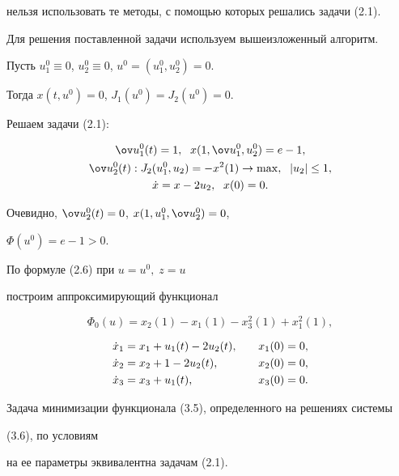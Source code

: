 \begin{exam}
нельзя использовать те методы, с помощью которых решались задачи (2.1).





Для решения поставленной задачи используем вышеизложенный алгоритм.


Пусть $u_1^0\equiv 0$, $u_2^0\equiv 0$, $u^0=(u_1^0,u_2^0)=0$.


Тогда $x(t,u^0)=0$, $J_1(u^0)=J_2(u^0)=0$.


Решаем задачи (2.1):


\begin{gather*}


\ov u_1^0(t)=1,\ \; x(1,\ov u_1^0,u_2^0)=e-1, \\


\ov u_2^0(t): J_2(u_1^0,u_2)=-x^2(1)\to \max,\ \; |u_2|\leq 1, \\


\Dot x=x-2u_2,\ \;x(0)=0.


\end{gather*}


Очевидно, $\ov u_2^0(t)=0$, $x(1,u_1^0,\ov u_2^0)=0$,


$\Phi(u^0)=e-1>0$.


По формуле (2.6) при $u=u^0,\; z=u$


построим аппроксимирующий функционал 


\begin{equation}


\Phi_0(u)=x_2(1)-x_1(1)-x^2_3(1)+x_1^2(1),


\end{equation}


\vskip -8mm





\begin{alignat}{2}


\Dot x_1&=x_1+u_1(t)-2u_2(t), &\quad &x_1(0)=0,\notag \\


\Dot x_2&=x_2+1-2u_2(t), &\quad &x_2(0)=0,\\


\Dot x_3&=x_3+u_1(t), &\quad &x_3(0)=0.\notag


\end{alignat}


Задача минимизации функционала (3.5), определенного на решениях системы


(3.6), по условиям 


на ее параметры эквивалентна задачам (2.1).



\end{exam}
